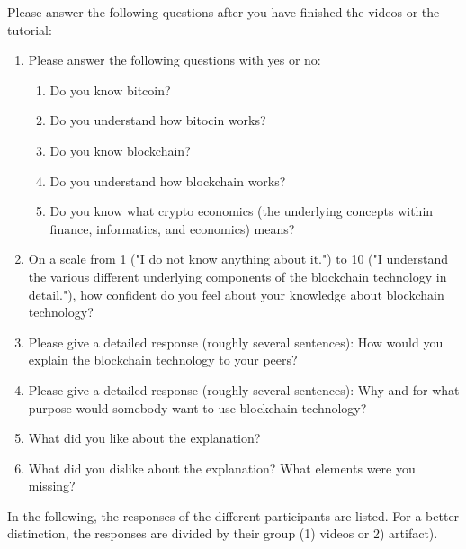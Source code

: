 Please answer the following questions after you have finished the videos or the tutorial:
\begin{enumerate}
\setcounter{enumi}{\value{xy}}
    \item Please answer the following questions with yes or no:
    \begin{enumerate}
        \item Do you know bitcoin?
        \item Do you understand how bitocin works?
        \item Do you know blockchain?
        \item Do you understand how blockchain works?
        \item Do you know what crypto economics (the underlying concepts within finance, informatics, and economics) means?
    \end{enumerate}
    \item On a scale from 1 ("I do not know anything about it.") to 10 ("I understand the various different underlying components of the blockchain technology in detail."), how confident do you feel about your knowledge about blockchain technology?
    \item Please give a detailed response (roughly several sentences): How would you explain the blockchain technology to your peers?
    \item Please give a detailed response (roughly several sentences): Why and for what purpose would somebody want to use blockchain technology?
    \item What did you like about the explanation?
    \item What did you dislike about the explanation? What elements were you missing?
\end{enumerate}

 \label{anhang:ResponsesQuestionnaire}

In the following, the responses of the different participants are listed. For a better distinction, the responses are divided by their group (1) videos or 2) artifact).


